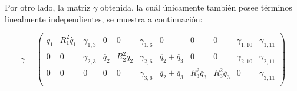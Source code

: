 \vspace{1cm}

Por otro lado, la matriz $\gamma$ obtenida, la cuál únicamente también posee términos linealmente independientes, se muestra a continuación:

\[
\gamma=
\begin{pmatrix}
\ddot{q_1} & R_{1}^{2}\dot{q_1} & \gamma_{1,3} & 0 & 0  & \gamma_{1,6} & 0 & 0 & 0 & \gamma_{1,10} & \gamma_{1,11} \\
0 & 0 & \gamma_{2,3} & \ddot{q_2} & R_{2}^{2}\dot{q_2} & \gamma_{2,6} & \ddot{q_2} + \ddot{q_3} & 0 & 0 & \gamma_{2,10} & \gamma_{2,11} \\
0 & 0 & 0 & 0 & 0 & \gamma_{3,6} & \ddot{q_2} + \ddot{q_3} & R_{3}^{2}\ddot{q_3} & R_{3}^{2}\ddot{q_3} & 0 & \gamma_{3,11} \\
\end{pmatrix} \] \vspace{0.3cm}

